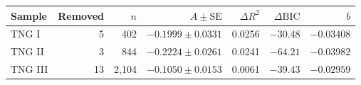 \begin{tabular}{lrrrrrr}
\toprule
Sample & Removed & $n$ & $A\pm\mathrm{SE}$ & $\Delta R^2$ & $\Delta\mathrm{BIC}$ & $b$ \\
\midrule
TNG I & 5 & 402 & $-0.1999\pm0.0331$ & 0.0256 & $-30.48$ & $-0.03408$ \\
TNG II & 3 & 844 & $-0.2224\pm0.0261$ & 0.0241 & $-64.21$ & $-0.03982$ \\
TNG III & 13 & 2,104 & $-0.1050\pm0.0153$ & 0.0061 & $-39.43$ & $-0.02959$ \\
\bottomrule
\end{tabular}
